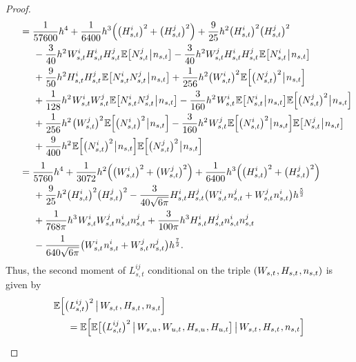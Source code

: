 \documentclass[sn-mathphys-num]{sn-jnl}%
\newcommand{\E}{\mathbb{E}}
\newcommand{\m}{\hspace{0.25mm}}
\newcommand{\mm}{\hspace{5mm}}
\newcommand{\mmm}{\hspace{10mm}}
\begin{document}
\begin{proof}
\begin{align*}
&\mm = \frac{1}{57600}h^4 + \frac{1}{6400}h^3 \Big(\big(H_{s,t}^i\big)^2 + \big(H_{s,t}^j\big)^2\Big) + \frac{9}{25}h^2\big(H_{s,t}^i\big)^2\big(H_{s,t}^j\big)^2\\
&\mmm - \frac{3}{40}h^2\m W_{s,t}^i H_{s,t}^i H_{s,t}^j\m \E\big[N_{s,t}^j\m\big|\m n_{s,t}\big] - \frac{3}{40}h^2 W_{s,t}^j H_{s,t}^i H_{s,t}^j\m \E\big[N_{s,t}^i\m\big|\m n_{s,t}\big]\\
&\mmm + \frac{9}{50}h^2 H_{s,t}^i H_{s,t}^j\m  \E\big[N_{s,t}^i N_{s,t}^j\m\big|\m n_{s,t}\big] + \frac{1}{256}h^2 \big(W_{s,t}^i\big)^2\m\E\Big[\big(N_{s,t}^j\big)^2\m\big|\m n_{s,t}\Big]\\
&\mmm + \frac{1}{128}h^2\m W_{s,t}^i W_{s,t}^j\m\E\big[N_{s,t}^i N_{s,t}^j\m\big|\m n_{s,t}\big] - \frac{3}{160}h^2\m W_{s,t}^i\m\E\big[N_{s,t}^i\m\big|\m n_{s,t}\big]\E\Big[\big(N_{s,t}^j\big)^2\m\big|\m n_{s,t}\Big]\\
&\mmm + \frac{1}{256}h^2\m\big(W_{s,t}^j\big)^2\m\E\Big[\big(N_{s,t}^i\big)^2\m\big|\m n_{s,t}\Big] - \frac{3}{160}h^2\m W_{s,t}^j\m\E\Big[\big(N_{s,t}^i\big)^2\m\big|\m n_{s,t}\Big]\E\big[N_{s,t}^j\m\big|\m n_{s,t}\big]\\
&\mmm + \frac{9}{400}h^2\m\E\Big[\big(N_{s,t}^i\big)^2\m\big|\m n_{s,t}\Big]\E\Big[\big(N_{s,t}^j\big)^2\m\big|\m n_{s,t}\Big]\\[3pt]
&\mm = \frac{1}{5760}h^4 + \frac{1}{3072}h^2 \Big(\big(W_{s,t}^i\big)^2 + \big(W_{s,t}^j\big)^2\Big) + \frac{1}{6400}h^3 \Big(\big(H_{s,t}^i\big)^2 + \big(H_{s,t}^j\big)^2\Big)\\
&\mmm + \frac{9}{25}h^2\big(H_{s,t}^i\big)^2\big(H_{s,t}^j\big)^2 - \frac{3}{40\sqrt{6\pi}}H_{s,t}^i H_{s,t}^j \big(W_{s,t}^i \m n_{s,t}^j +  W_{s,t}^j \m n_{s,t}^i\big) h^\frac{5}{2}\\
&\mmm + \frac{1}{768\pi}h^3\m W_{s,t}^i W_{s,t}^j\m n_{s,t}^i n_{s,t}^j + \frac{3}{100\pi}h^3 H_{s,t}^i H_{s,t}^j n_{s,t}^i n_{s,t}^j\\[2pt]
&\mmm - \frac{1}{640\sqrt{6\pi}}\big(W_{s,t}^i\m n_{s,t}^i +  W_{s,t}^j\m n_{s,t}^j\big)h^\frac{7}{2}.
\end{align*}
Thus, the second moment of $L_{s,t}^{ij}$ conditional on the triple $(W_{s,t}\m, H_{s,t}\m, n_{s,t})$ is given by
\begin{align*}
&\E\Big[\big(L_{s,t}^{ij}\big)^2\,\big|\, W_{s,t}\m, H_{s,t}\m, n_{s,t}\Big]\\
&\mm = \E\Big[\E\big[\big(L_{s,t}^{ij}\big)^2\,\big|\, W_{s,u}\m, W_{u,t}\m, H_{s,u}\m, H_{u,t}\big]\,\big|\, W_{s,t}\m, H_{s,t}\m, n_{s,t}\Big]\\[3pt]

\end{align*}
\end{proof}
\end{document}
